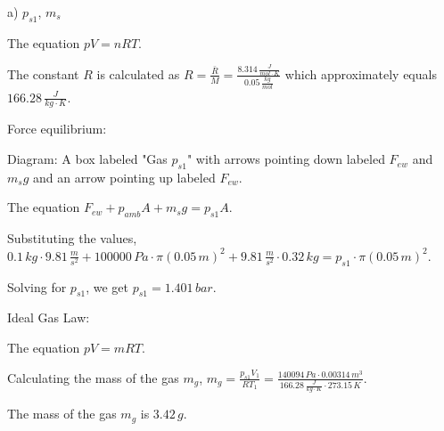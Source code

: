 a) \( p_{s1} \), \( m_s \)

The equation \( pV = nRT \).

The constant \( R \) is calculated as \( R = \frac{\bar{R}}{M} = \frac{8.314 \, \frac{J}{mol \cdot K}}{0.05 \, \frac{kg}{mol}} \) which approximately equals \( 166.28 \, \frac{J}{kg \cdot K} \).

Force equilibrium:

Diagram: A box labeled "Gas \( p_{s1} \)" with arrows pointing down labeled \( F_{ew} \) and \( m_s g \) and an arrow pointing up labeled \( F_{ew} \).

The equation \( F_{ew} + p_{amb} A + m_s g = p_{s1} A \).

Substituting the values, \( 0.1 \, kg \cdot 9.81 \, \frac{m}{s^2} + 100000 \, Pa \cdot \pi (0.05 \, m)^2 + 9.81 \, \frac{m}{s^2} \cdot 0.32 \, kg = p_{s1} \cdot \pi (0.05 \, m)^2 \).

Solving for \( p_{s1} \), we get \( p_{s1} = 1.401 \, bar \).

Ideal Gas Law:

The equation \( pV = mRT \).

Calculating the mass of the gas \( m_g \), \( m_g = \frac{p_{s1} V_1}{R T_1} = \frac{140094 \, Pa \cdot 0.00314 \, m^3}{166.28 \, \frac{J}{kg \cdot K} \cdot 273.15 \, K} \).

The mass of the gas \( m_g \) is \( 3.42 \, g \).
